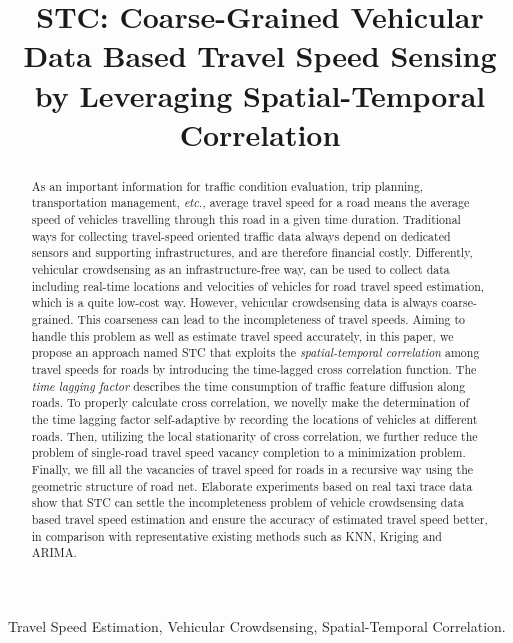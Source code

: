 \documentclass[twocolumn,10pt,final,conference]{IEEEtran}
\def\etc{\textit{etc.}\xspace}
\begin{document}
\title{STC: Coarse-Grained Vehicular Data Based Travel Speed Sensing by Leveraging Spatial-Temporal Correlation}
\author{
}
\maketitle
\thispagestyle{empty}

\begin{abstract}
As an important information for traffic condition evaluation, trip planning, transportation management, \etc, average travel speed for a road means the average speed of vehicles travelling through this road in a given time duration.
Traditional ways for collecting travel-speed oriented traffic data always depend on dedicated sensors and supporting infrastructures, and are therefore financial costly.
Differently, vehicular crowdsensing as an infrastructure-free way, can be used to collect data including real-time locations and velocities of vehicles for road travel speed estimation, which is a quite low-cost way. However, vehicular crowdsensing data is always coarse-grained. This coarseness can lead to the incompleteness of travel speeds. Aiming to handle this problem as well as estimate travel speed accurately, in this paper, we propose an approach named STC that exploits the \emph{spatial-temporal correlation} among travel speeds for roads by introducing the time-lagged cross correlation function. The \emph{time lagging factor} describes the time consumption of traffic feature diffusion along roads. To properly calculate cross correlation, we novelly make the determination of the time lagging factor self-adaptive by recording the locations of vehicles at different roads. Then, utilizing the local stationarity of cross correlation, we further reduce the problem of single-road travel speed vacancy completion to a minimization problem. Finally, we fill all the vacancies of travel speed for roads in a recursive way using the geometric structure of road net. Elaborate experiments based on real taxi trace data show that STC can settle the incompleteness problem of vehicle crowdsensing data based travel speed estimation and ensure the accuracy of estimated travel speed better, in comparison with representative existing methods such as KNN, Kriging and ARIMA.
\end{abstract}
\begin{IEEEkeywords}
Travel Speed Estimation, Vehicular Crowdsensing, Spatial-Temporal Correlation.
\end{IEEEkeywords}
\end{document}
